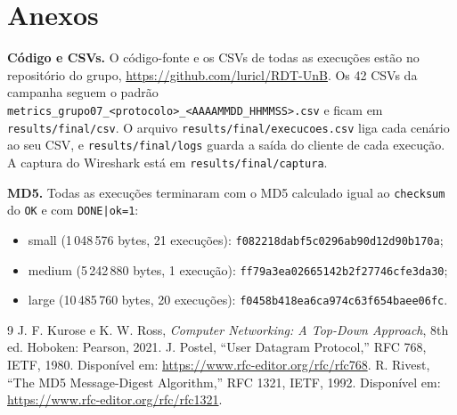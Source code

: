 \documentclass[11pt,a4paper]{article}
\begin{document}
\section*{Anexos}
\begin{sloppypar}

\textbf{Código e CSVs.} O código-fonte e os CSVs de todas as execuções estão
no repositório do grupo, \url{https://github.com/luricl/RDT-UnB}. Os 42 CSVs da
campanha seguem o padrão
\texttt{metrics\_grupo07\_<protocolo>\_<AAAAMMDD\_HHMMSS>.csv} e ficam em
\texttt{results/final/csv}. O arquivo \texttt{results/final/execucoes.csv}
liga cada cenário ao seu CSV, e \texttt{results/final/logs} guarda a saída do
cliente de cada execução. A captura do Wireshark está em
\texttt{results/final/captura}.

\textbf{MD5.} Todas as execuções terminaram com o MD5 calculado igual ao
\texttt{checksum} do \texttt{OK} e com \texttt{DONE|ok=1}:
\begin{itemize}[nosep]
  \item small (1\,048\,576 bytes, 21 execuções):
    \texttt{f082218dabf5c0296ab90d12d90b170a};
  \item medium (5\,242\,880 bytes, 1 execução):
    \texttt{ff79a3ea02665142b2f27746cfe3da30};
  \item large (10\,485\,760 bytes, 20 execuções):
    \texttt{f0458b418ea6ca974c63f654baee06fc}.
\end{itemize}

\end{sloppypar}

\begin{thebibliography}{9}
   J. F. Kurose e K. W. Ross, \textit{Computer Networking: A Top-Down
    Approach}, 8th ed. Hoboken: Pearson, 2021.
   J. Postel, ``User Datagram Protocol,'' RFC 768, IETF, 1980.
    Disponível em: \url{https://www.rfc-editor.org/rfc/rfc768}.
   R. Rivest, ``The MD5 Message-Digest Algorithm,'' RFC 1321, IETF, 1992.
    Disponível em: \url{https://www.rfc-editor.org/rfc/rfc1321}.
\end{thebibliography}
\end{document}
